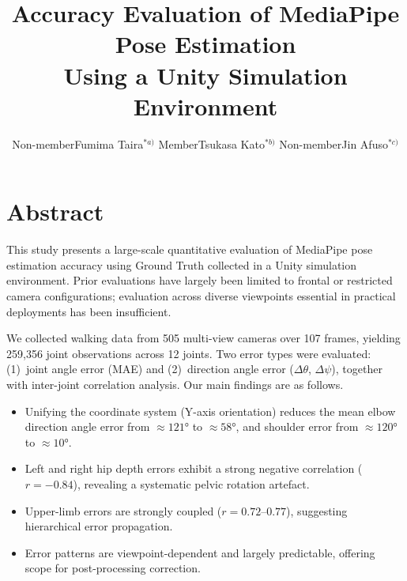 \documentclass[twocolumn]{article}
\title{Accuracy Evaluation of MediaPipe Pose Estimation\\
       Using a Unity Simulation Environment}
\author{%
  Non-member\quad Fumima Taira$^{*a)}$ \qquad
  Member\quad    Tsukasa Kato$^{*b)}$ \qquad
  Non-member\quad Jin Afuso$^{*c)}$\footnotemark[1]
}
\date{}
\begin{document}
\maketitle

\begingroup
\renewcommand{\thefootnote}{}
\endgroup

\section*{Abstract}


This study presents a large-scale quantitative evaluation of MediaPipe pose
estimation accuracy using Ground Truth collected in a Unity simulation
environment. Prior evaluations have largely been limited to frontal or
restricted camera configurations; evaluation across diverse viewpoints
essential in practical deployments has been insufficient.

We collected walking data from 505 multi-view cameras over 107 frames,
yielding 259,356 joint observations across 12 joints. Two error types were
evaluated: (1)~joint angle error (MAE) and (2)~direction angle error
($\Delta\theta$, $\Delta\psi$), together with inter-joint correlation
analysis. Our main findings are as follows.
\begin{itemize}\itemsep0pt
  \item Unifying the coordinate system (Y-axis orientation) reduces the mean
        elbow direction angle error from $\approx121°$ to $\approx58°$, and
        shoulder error from $\approx120°$ to $\approx10°$.
  \item Left and right hip depth errors exhibit a strong negative correlation
        ($r = -0.84$), revealing a systematic pelvic rotation artefact.
  \item Upper-limb errors are strongly coupled ($r = 0.72$–$0.77$),
        suggesting hierarchical error propagation.
  \item Error patterns are viewpoint-dependent and largely predictable,
        offering scope for post-processing correction.
\end{itemize}
\end{document}
